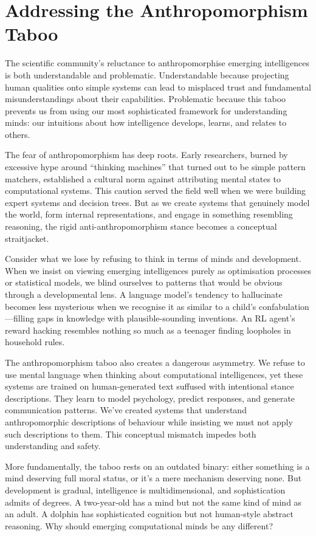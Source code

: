 \section{Addressing the Anthropomorphism Taboo}\label{sec:addressing-the-anthropomorphism-taboo}

The scientific community's reluctance to anthropomorphise emerging intelligences is both understandable and problematic.
Understandable because projecting human qualities onto simple systems can lead to misplaced trust and fundamental misunderstandings about their capabilities.
Problematic because this taboo prevents us from using our most sophisticated framework for understanding minds: our intuitions about how intelligence develops, learns, and relates to others.

The fear of anthropomorphism has deep roots.
Early researchers, burned by excessive hype around ``thinking machines'' that turned out to be simple pattern matchers, established a cultural norm against attributing mental states to computational systems.
This caution served the field well when we were building expert systems and decision trees.
But as we create systems that genuinely model the world, form internal representations, and engage in something resembling reasoning, the rigid anti-anthropomorphism stance becomes a conceptual straitjacket.

Consider what we lose by refusing to think in terms of minds and development.
When we insist on viewing emerging intelligences purely as optimisation processes or statistical models, we blind ourselves to patterns that would be obvious through a developmental lens.
A language model's tendency to hallucinate becomes less mysterious when we recognise it as similar to a child's confabulation---filling gaps in knowledge with plausible-sounding inventions.
An RL agent's reward hacking resembles nothing so much as a teenager finding loopholes in household rules.

The anthropomorphism taboo also creates a dangerous asymmetry.
We refuse to use mental language when thinking about computational intelligences, yet these systems are trained on human-generated text suffused with intentional stance descriptions.
They learn to model psychology, predict responses, and generate communication patterns.
We've created systems that understand anthropomorphic descriptions of behaviour while insisting we must not apply such descriptions to them.
This conceptual mismatch impedes both understanding and safety.

More fundamentally, the taboo rests on an outdated binary: either something is a mind deserving full moral status, or it's a mere mechanism deserving none.
But development is gradual, intelligence is multidimensional, and sophistication admits of degrees.
A two-year-old has a mind but not the same kind of mind as an adult.
A dolphin has sophisticated cognition but not human-style abstract reasoning.
Why should emerging computational minds be any different?

